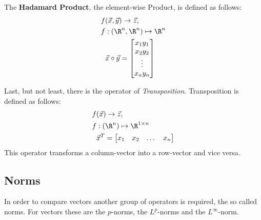 The \textbf{Hadamard Product}, the element-wise Product, is defined as follows:
\begin{align*}
  f&(\vec{x}, \vec{y}) \rightarrow \vec{z},\\
  f&: (\R^n, \R^n) \mapsto \R^n\\
  &\vec{x} \circ \vec{y} = \begin{bmatrix}
    x_1 y_1 \\ x_2 y_2 \\ \vdots \\ x_n y_n
  \end{bmatrix}
\end{align*}

Last, but not least, there is the operator of \textit{Transposition}. Transposition is defined as follows:
\begin{align*}
  f&(\vec{x}) \rightarrow \vec{z},\\
  f&: (\R^n) \mapsto \R^{1 \times n}\\
  &\vec{x}^T = \begin{bmatrix}
    x_1 & x_2 & \dots & x_n
  \end{bmatrix}
\end{align*}
This operator transforms a column-vector into a row-vector and vice versa.

\subsection{Norms}
In order to compare vectors another group of operators is required, the so called norms.
For vectors these are the $p$-norms, the $L^p$-norms and the $L^{\infty}$-norm.


